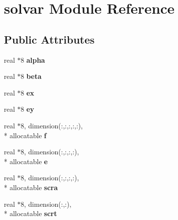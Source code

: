 \hypertarget{classsolvar}{\section{solvar Module Reference}
\label{classsolvar}
}
\subsection*{Public Attributes}
\begin{DoxyCompactItemize}
\item 
\hypertarget{classsolvar_a073d1315bc680fb39fc362ba6bf594ce}{real $\ast$8 {\bfseries alpha}}\label{classsolvar_a073d1315bc680fb39fc362ba6bf594ce}

\item 
\hypertarget{classsolvar_a5725a2a0747337e1d16960a3b85200a8}{real $\ast$8 {\bfseries beta}}\label{classsolvar_a5725a2a0747337e1d16960a3b85200a8}

\item 
\hypertarget{classsolvar_a06391e51201248c94eb6d340df3e1c09}{real $\ast$8 {\bfseries ex}}\label{classsolvar_a06391e51201248c94eb6d340df3e1c09}

\item 
\hypertarget{classsolvar_a6541ccef52d3c64c3307c1c7d641ded9}{real $\ast$8 {\bfseries ey}}\label{classsolvar_a6541ccef52d3c64c3307c1c7d641ded9}

\item 
\hypertarget{classsolvar_a65e316cbab45ed4383866a58bae753e4}{real $\ast$8, dimension(\+:,\+:,\+:,\+:,\+:), \\*
allocatable {\bfseries f}}\label{classsolvar_a65e316cbab45ed4383866a58bae753e4}

\item 
\hypertarget{classsolvar_abe73949647c2e368d832225599eead80}{real $\ast$8, dimension(\+:,\+:,\+:,\+:), \\*
allocatable {\bfseries e}}\label{classsolvar_abe73949647c2e368d832225599eead80}

\item 
\hypertarget{classsolvar_a0ba299df51d0061cf61eb0e3946501d1}{real $\ast$8, dimension(\+:,\+:,\+:,\+:), \\*
allocatable {\bfseries scra}}\label{classsolvar_a0ba299df51d0061cf61eb0e3946501d1}

\item 
\hypertarget{classsolvar_aa87e48bb8745643196367bffc83022fa}{real $\ast$8, dimension(\+:,\+:), \\*
allocatable {\bfseries scrt}}\label{classsolvar_aa87e48bb8745643196367bffc83022fa}


\end{DoxyCompactItemize}
